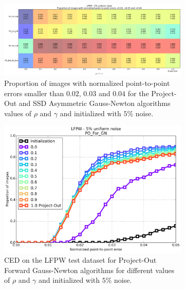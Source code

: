 \begin{figure}[p]
	\centering
	\begin{subfigure}{\textwidth}
	    \includegraphics[width=\textwidth]{experiments/rho/convergence_vs_rho_po_gn_5.png}
	    \caption{Proportion of images with normalized point-to-point errors smaller than $0.02$, $0.03$ and $0.04$ for the Project-Out and SSD Asymmetric Gauss-Newton algorithms values of $\rho$ and $\gamma$ and initialized with $5\%$ noise.}
	    \label{fig:convergence_vs_rho_po_gn}
	\end{subfigure}
	\par\bigskip
	\begin{subfigure}{0.48\textwidth}
	    \includegraphics[width=\textwidth]{experiments/rho/ced_po_for_gn_5.png}
	    \caption{CED on the LFPW test dataset for Project-Out Forward Gauss-Newton algorithms for different values of $\rho$ and $\gamma$ and initialized with $5\%$ noise.}
	    \label{fig:ced_po_for_gn}
	\end{subfigure}
	\hfill
	\begin{subfigure}{0.48\textwidth}

\end{subfigure}
\end{figure}
